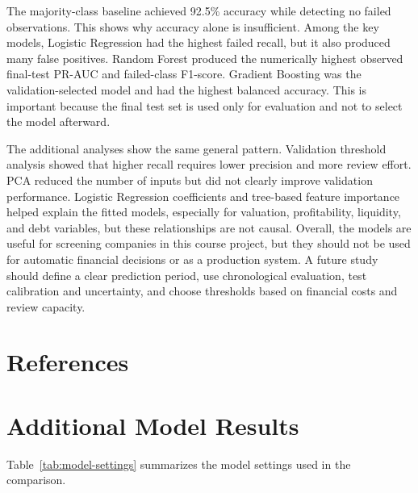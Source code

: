 \documentclass[11pt,a4paper]{article}
\begin{document}
The majority-class baseline achieved 92.5\% accuracy while detecting no failed
observations. This shows why accuracy alone is insufficient. Among the key
models, Logistic Regression had the highest failed recall, but it also produced
many false positives. Random Forest produced the numerically highest observed
final-test PR-AUC and failed-class F1-score. Gradient Boosting was the
validation-selected model and had the highest balanced accuracy. This
is important because the final test set is used only for evaluation and not to
select the model afterward.

The additional analyses show the same general pattern. Validation threshold
analysis showed that higher recall requires lower precision and more review
effort. PCA reduced the number of inputs but did not clearly improve validation
performance. Logistic Regression coefficients and tree-based feature importance
helped explain the fitted models, especially for valuation, profitability,
liquidity, and debt variables, but these relationships are not causal. Overall,
the models are useful for screening companies in this course project, but they
should not be used for automatic financial decisions or as a production system.
A future study should define a clear prediction period, use chronological
evaluation, test calibration and uncertainty, and choose thresholds based on
financial costs and review capacity.

\clearpage

  {}
  {\section*{References}}

\clearpage
\appendix

\section{Additional Model Results}
\label{app:model-results}

Table~\ref{tab:model-settings} summarizes the model settings used in the
comparison.
\end{document}
